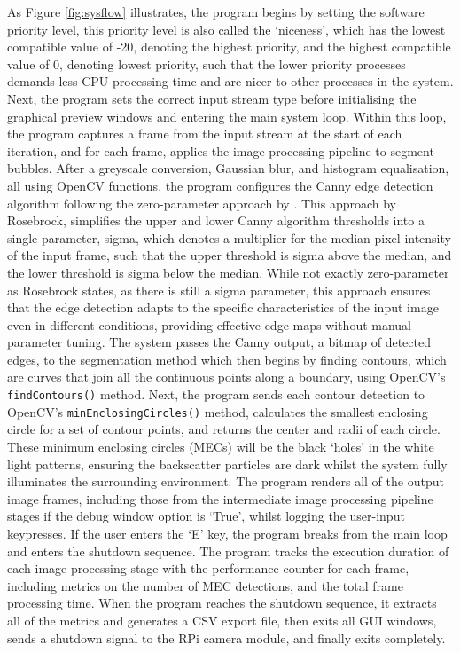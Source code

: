 As Figure \ref{fig:sysflow} illustrates, the program begins by setting the software priority level, this priority level is also called the `niceness', which has the lowest compatible value of -20, denoting the highest priority, and the highest compatible value of 0, denoting lowest priority, such that the lower priority processes demands less CPU processing time and are nicer to other processes in the system. Next, the program sets the correct input stream type before initialising the graphical preview windows and entering the main system loop. Within this loop, the program captures a frame from the input stream at the start of each iteration, and for each frame, applies the image processing pipeline to segment bubbles. After a greyscale conversion, Gaussian blur, and histogram equalisation, all using OpenCV functions, the program configures the Canny edge detection algorithm following the zero-parameter approach by \cite{rosebrockZeroparameterAutomaticCanny2015}. This approach by Rosebrock, simplifies the upper and lower Canny algorithm thresholds into a single parameter, sigma, which denotes a multiplier for the median pixel intensity of the input frame, such that the upper threshold is sigma above the median, and the lower threshold is sigma below the median. While not exactly zero-parameter as Rosebrock states, as there is still a sigma parameter, this approach ensures that the edge detection adapts to the specific characteristics of the input image even in different conditions, providing effective edge maps without manual parameter tuning. The system passes the Canny output, a bitmap of detected edges, to the segmentation method which then begins by finding contours, which are curves that join all the continuous points along a boundary, using OpenCV's \texttt{findContours()} method. Next, the program sends each contour detection to OpenCV's \texttt{minEnclosingCircles()} method, calculates the smallest enclosing circle for a set of contour points, and returns the center and radii of each circle. These minimum enclosing circles (MECs) will be the black `holes' in the white light patterns, ensuring the backscatter particles are dark whilst the system fully illuminates the surrounding environment. The program renders all of the output image frames, including those from the intermediate image processing pipeline stages if the debug window option is `True', whilst logging the user-input keypresses. If the user enters the `E' key, the program breaks from the main loop and enters the shutdown sequence. The program tracks the execution duration of each image processing stage with the performance counter for each frame, including metrics on the number of MEC detections, and the total frame processing time. When the program reaches the shutdown sequence, it extracts all of the metrics and generates a CSV export file, then exits all GUI windows, sends a shutdown signal to the RPi camera module, and finally exits completely.

